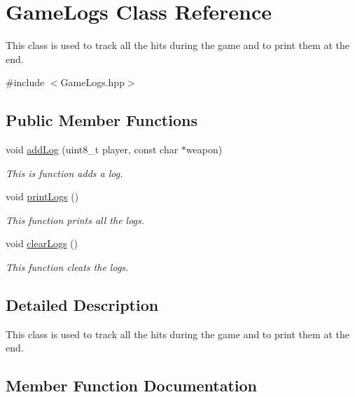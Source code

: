 \hypertarget{class_game_logs}{}\section{Game\+Logs Class Reference}
\label{class_game_logs}


This class is used to track all the hits during the game and to print them at the end.  




{\ttfamily \#include $<$Game\+Logs.\+hpp$>$}

\subsection*{Public Member Functions}
\begin{DoxyCompactItemize}
\item 
void \mbox{\hyperlink{class_game_logs_aff50867c6abefacf3d80180015f94e70}{add\+Log}} (uint8\+\_\+t player, const char $\ast$weapon)
\begin{DoxyCompactList}\small\item\em This is function adds a log. \end{DoxyCompactList}\item 
void \mbox{\hyperlink{class_game_logs_a8c7dec27f1cd0c1b6df508b9e3172459}{print\+Logs}} ()
\begin{DoxyCompactList}\small\item\em This function prints all the logs. \end{DoxyCompactList}\item 
void \mbox{\hyperlink{class_game_logs_ab645b6718f2d5ee716c8b4df4dddf561}{clear\+Logs}} ()
\begin{DoxyCompactList}\small\item\em This function cleats the logs. \end{DoxyCompactList}\end{DoxyCompactItemize}


\subsection{Detailed Description}
This class is used to track all the hits during the game and to print them at the end. 

\subsection{Member Function Documentation}
\mbox{\label{class_game_logs_aff50867c6abefacf3d80180015f94e70}} 
